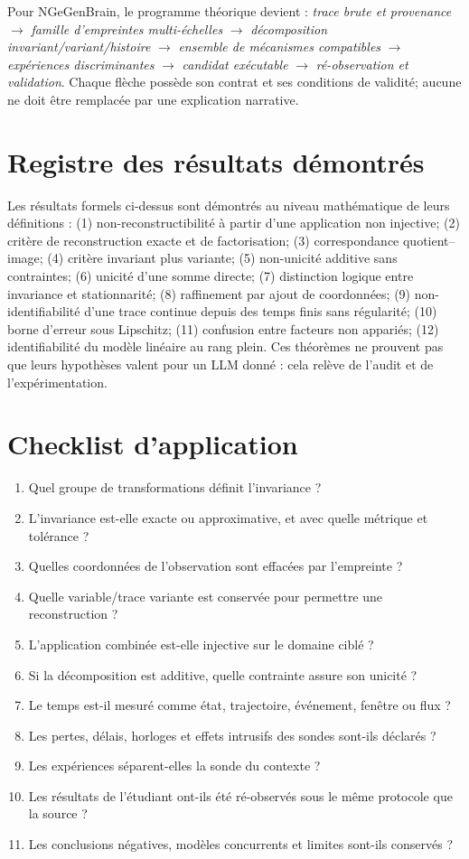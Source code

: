 \documentclass[11pt,oneside]{book}
\theoremstyle{definition}\newtheorem{definition}[theoreme]{Définition}\newtheorem{hypothese}[theoreme]{Hypothèse explicite}\newtheorem{convention}[theoreme]{Convention}\newtheorem{critere}[theoreme]{Critère}
\theoremstyle{remark}\newtheorem{remarque}[theoreme]{Remarque}\newtheorem{contreexemple}[theoreme]{Contre-exemple}
\begin{document}
Pour NGeGenBrain, le programme théorique devient : \emph{trace brute et provenance} \(\to\) \emph{famille d'empreintes multi-échelles} \(\to\) \emph{décomposition invariant/variant/histoire} \(\to\) \emph{ensemble de mécanismes compatibles} \(\to\) \emph{expériences discriminantes} \(\to\) \emph{candidat exécutable} \(\to\) \emph{ré-observation et validation}. Chaque flèche possède son contrat et ses conditions de validité; aucune ne doit être remplacée par une explication narrative.

\appendix
\chapter{Registre des résultats démontrés}
Les résultats formels ci-dessus sont démontrés au niveau mathématique de leurs définitions : (1) non-reconstructibilité à partir d'une application non injective; (2) critère de reconstruction exacte et de factorisation; (3) correspondance quotient--image; (4) critère invariant plus variante; (5) non-unicité additive sans contraintes; (6) unicité d'une somme directe; (7) distinction logique entre invariance et stationnarité; (8) raffinement par ajout de coordonnées; (9) non-identifiabilité d'une trace continue depuis des temps finis sans régularité; (10) borne d'erreur sous Lipschitz; (11) confusion entre facteurs non appariés; (12) identifiabilité du modèle linéaire au rang plein. Ces théorèmes ne prouvent pas que leurs hypothèses valent pour un LLM donné : cela relève de l'audit et de l'expérimentation.

\chapter{Checklist d'application}
\begin{enumerate}[label=\textbf{I\arabic*.}]
\item Quel groupe de transformations définit l'invariance ?
\item L'invariance est-elle exacte ou approximative, et avec quelle métrique et tolérance ?
\item Quelles coordonnées de l'observation sont effacées par l'empreinte ?
\item Quelle variable/trace variante est conservée pour permettre une reconstruction ?
\item L'application combinée est-elle injective sur le domaine ciblé ?
\item Si la décomposition est additive, quelle contrainte assure son unicité ?
\item Le temps est-il mesuré comme état, trajectoire, événement, fenêtre ou flux ?
\item Les pertes, délais, horloges et effets intrusifs des sondes sont-ils déclarés ?
\item Les expériences séparent-elles la sonde du contexte ?
\item Les résultats de l'étudiant ont-ils été ré-observés sous le même protocole que la source ?
\item Les conclusions négatives, modèles concurrents et limites sont-ils conservés ?
\end{enumerate}
\end{document}
